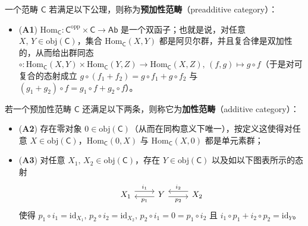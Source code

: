 \begin{Def}\label{addcat}
	一个范畴 $\mathsf{C}$ 若满足以下公理，则称为\textbf{预加性范畴}（preadditive category）：
	\begin{itemize}[leftmargin=0.5cm]
		\renewcommand{\labelitemi}{\textendash}
		\item (\textbf{A1}) $\text{Hom}_\mathsf{C}:\mathsf{C}^\text{opp}\times\mathsf{C}\rightarrow\mathsf{Ab}$ 是一个双函子；也就是说，对任意 $X,\,Y\in\text{obj}(\mathsf{C})$，集合 $\text{Hom}_\mathsf{C}(X,Y)$ 都是阿贝尔群，并且复合律是双加性的，从而给出群同态 $\circ:\text{Hom}_\mathsf{C}(X,Y)\times \text{Hom}_\mathsf{C}(Y,Z)\rightarrow\text{Hom}_\mathsf{C}(X,Z),\,(f,g)\mapsto g\circ f$（于是对可复合的态射成立 $g\circ (f_1+f_2)=g\circ f_1 + g\circ f_2$ 与 $(g_1+g_2)\circ f= g_1\circ f + g_2\circ f$）。
	\end{itemize}
	若一个预加性范畴 $\mathsf{C}$ 还满足以下两条，则称它为\textbf{加性范畴}（additive category）：
	\begin{itemize}[leftmargin=0.5cm]
		\renewcommand{\labelitemi}{\textendash}
		\item (\textbf{A2}) 存在零对象 $0\in\text{obj}(\mathsf{C})$（从而在同构意义下唯一），按定义这使得对任意 $X\in\text{obj}(\mathsf{C})$，$\text{Hom}_\mathsf{C}(0,X)$ 与 $\text{Hom}_\mathsf{C}(X,0)$ 都是单元素群；

		\item (\textbf{A3}) 对任意 $X_1,\,X_2\in\text{obj}(\mathsf{C})$，存在 $Y\in\text{obj}(\mathsf{C})$ 以及如以下图表所示的态射
		\begin{equation}\label{directprodsum}
			\begin{tikzcd}
				X_1\arrow[r, yshift=1ex, "i_1"] & Y\arrow[l, yshift=-0.5ex, "p_1"]\arrow[r, yshift=-0.5ex, "p_2"'] & X_2\arrow[l, yshift=1ex, "i_2"']
			\end{tikzcd}
		\end{equation}
		使得 $p_1\circ i_1=\text{id}_{X_1},\,p_2\circ i_2=\text{id}_{X_2},\,p_2\circ i_1=0=p_1\circ i_2$ 且 $i_1\circ p_1 + i_2\circ p_2=\text{id}_Y$。
	\end{itemize}
\end{Def}


